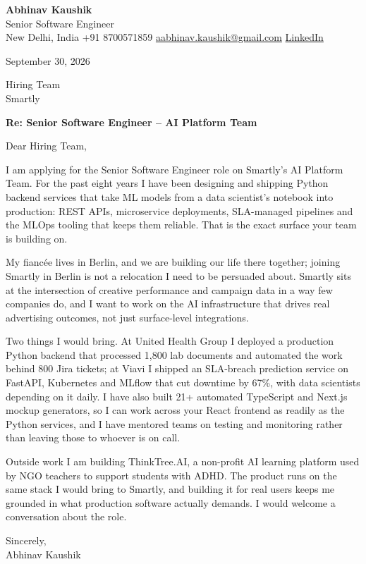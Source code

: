 \documentclass[11pt,a4paper]{article}
\begin{document}
{\Large\bfseries Abhinav Kaushik}\\
Senior Software Engineer\\
New Delhi, India \textbar{} +91 8700571859 \textbar{} \href{mailto:aabhinav.kaushik@gmail.com}{aabhinav.kaushik@gmail.com} \textbar{} \href{https://www.linkedin.com/in/abhinav-kaushik10/}{LinkedIn}

September 30, 2026

Hiring Team\\
Smartly

\textbf{Re: Senior Software Engineer -- AI Platform Team}

Dear Hiring Team,

I am applying for the Senior Software Engineer role on Smartly's AI Platform Team. For the past eight years I have been designing and shipping Python backend services that take ML models from a data scientist's notebook into production: REST APIs, microservice deployments, SLA-managed pipelines and the MLOps tooling that keeps them reliable. That is the exact surface your team is building on.

My fiancée lives in Berlin, and we are building our life there together; joining Smartly in Berlin is not a relocation I need to be persuaded about. Smartly sits at the intersection of creative performance and campaign data in a way few companies do, and I want to work on the AI infrastructure that drives real advertising outcomes, not just surface-level integrations.

Two things I would bring. At United Health Group I deployed a production Python backend that processed 1,800 lab documents and automated the work behind 800 Jira tickets; at Viavi I shipped an SLA-breach prediction service on FastAPI, Kubernetes and MLflow that cut downtime by 67\%, with data scientists depending on it daily. I have also built 21+ automated TypeScript and Next.js mockup generators, so I can work across your React frontend as readily as the Python services, and I have mentored teams on testing and monitoring rather than leaving those to whoever is on call.

Outside work I am building ThinkTree.AI, a non-profit AI learning platform used by NGO teachers to support students with ADHD. The product runs on the same stack I would bring to Smartly, and building it for real users keeps me grounded in what production software actually demands. I would welcome a conversation about the role.

Sincerely,\\[4pt]
Abhinav Kaushik
\end{document}
